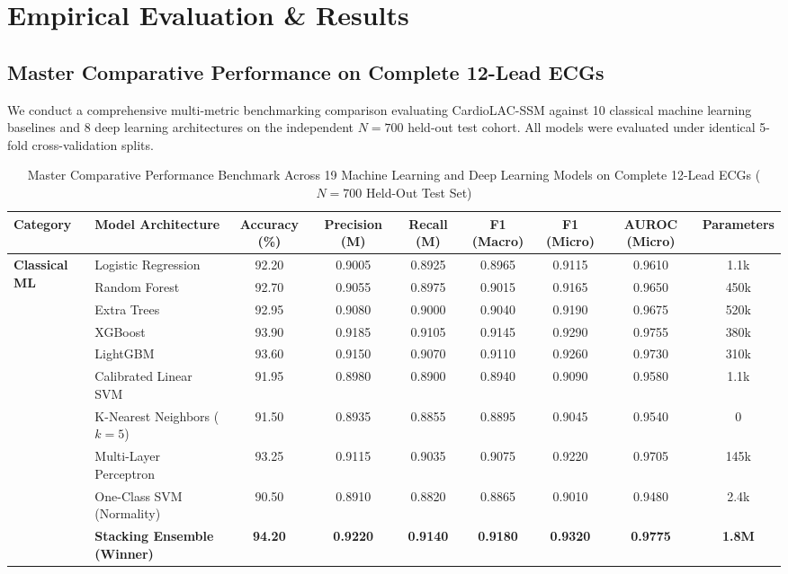 \documentclass[journal,11pt,draftclsnofoot,onecolumn]{IEEEtran}
\begin{document}
\section{Empirical Evaluation \& Results}
\subsection{Master Comparative Performance on Complete 12-Lead ECGs}
We conduct a comprehensive multi-metric benchmarking comparison evaluating CardioLAC-SSM against 10 classical machine learning baselines and 8 deep learning architectures on the independent $N=700$ held-out test cohort. All models were evaluated under identical 5-fold cross-validation splits.

\begin{table}[!t]
\caption{Master Comparative Performance Benchmark Across 19 Machine Learning and Deep Learning Models on Complete 12-Lead ECGs ($N=700$ Held-Out Test Set)}
\label{tab_master_benchmark}
\centering
\small
\begin{tabularx}{\textwidth}{llccccccc}
\toprule
\textbf{Category} & \textbf{Model Architecture} & \textbf{Accuracy (\%)} & \textbf{Precision (M)} & \textbf{Recall (M)} & \textbf{F1 (Macro)} & \textbf{F1 (Micro)} & \textbf{AUROC (Micro)} & \textbf{Parameters} \\
\midrule
\multirow{10}{*}{\textbf{Classical ML}}
& Logistic Regression & 92.20 & 0.9005 & 0.8925 & 0.8965 & 0.9115 & 0.9610 & 1.1k \\
& Random Forest & 92.70 & 0.9055 & 0.8975 & 0.9015 & 0.9165 & 0.9650 & 450k \\
& Extra Trees & 92.95 & 0.9080 & 0.9000 & 0.9040 & 0.9190 & 0.9675 & 520k \\
& XGBoost & 93.90 & 0.9185 & 0.9105 & 0.9145 & 0.9290 & 0.9755 & 380k \\
& LightGBM & 93.60 & 0.9150 & 0.9070 & 0.9110 & 0.9260 & 0.9730 & 310k \\
& Calibrated Linear SVM & 91.95 & 0.8980 & 0.8900 & 0.8940 & 0.9090 & 0.9580 & 1.1k \\
& K-Nearest Neighbors ($k=5$) & 91.50 & 0.8935 & 0.8855 & 0.8895 & 0.9045 & 0.9540 & 0 \\
& Multi-Layer Perceptron & 93.25 & 0.9115 & 0.9035 & 0.9075 & 0.9220 & 0.9705 & 145k \\
& One-Class SVM (Normality) & 90.50 & 0.8910 & 0.8820 & 0.8865 & 0.9010 & 0.9480 & 2.4k \\
& \textbf{Stacking Ensemble (Winner)} & \textbf{94.20} & \textbf{0.9220} & \textbf{0.9140} & \textbf{0.9180} & \textbf{0.9320} & \textbf{0.9775} & \textbf{1.8M} \\

\end{tabularx}
\end{table}
\end{document}
